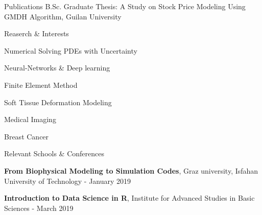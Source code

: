 \documentclass{resume} %
\begin{document}
\begin{rSection}{Publications}
	 B.Sc. Graduate Thesis: A Study on Stock Price Modeling Using GMDH Algorithm, Guilan University\\	
\end{rSection}
\begin{rSection}{Reaserch \& Interests}	
	\begin{rSubsection}{}{}{}{}
		\item Numerical Solving PDEs with Uncertainty
		\item Neural-Networks \& Deep learning
		\item Finite Element Method
		\item Soft Tissue Deformation Modeling
		\item Medical Imaging
		\item Breast Cancer
	\end{rSubsection}	
\end{rSection}
\begin{rSection}{Relevant Schools \& Conferences}	
	\begin{rSubsection}{}{}{}{}
		\item \textbf{From Biophysical Modeling to Simulation Codes}, Graz university, Isfahan University of Technology - January 2019
		\item \textbf{Introduction to Data Science in R}, Institute for Advanced Studies in Basic Sciences - March 2019 %
	\end{rSubsection}
\end{rSection}
\end{document}
